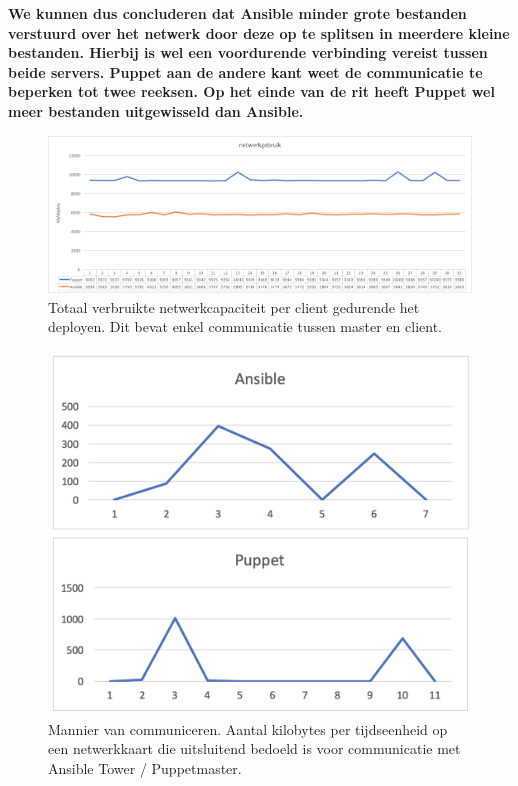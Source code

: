 \textbf{We kunnen dus concluderen dat Ansible minder grote bestanden verstuurd over het netwerk door deze op te splitsen in meerdere kleine bestanden. Hierbij is wel een voordurende verbinding vereist tussen beide servers. Puppet aan de andere kant weet de communicatie te beperken tot twee reeksen. Op het einde van de rit heeft Puppet wel meer bestanden uitgewisseld dan  Ansible. }

\begin{figure}
	\includegraphics[width=\linewidth]{img/netwerkverbruik.png}
	\caption{Totaal verbruikte netwerkcapaciteit per client gedurende het deployen. Dit bevat enkel communicatie tussen master en client.}  
	\label{fig:netwerkverbruik}
\end{figure}


\begin{figure}
	\includegraphics[width=\linewidth]{img/deploytypes.png}
	\caption{Mannier van communiceren. Aantal kilobytes per tijdseenheid op een netwerkkaart die uitsluitend bedoeld is voor communicatie met Ansible Tower / Puppetmaster. }  
	\label{fig:deploytypes}
\end{figure}
 

